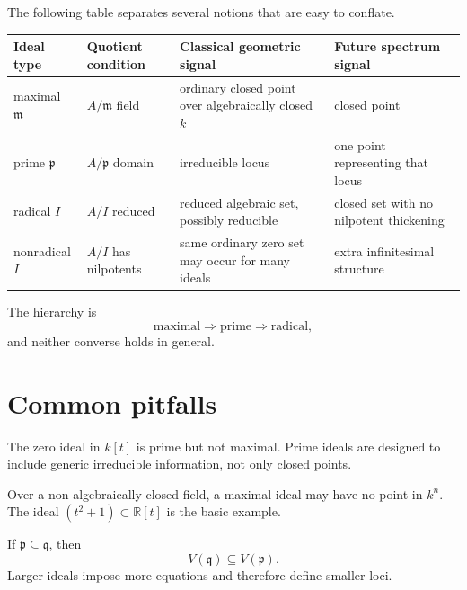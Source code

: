 The following table separates several notions that are easy to conflate.

\begin{center}
\begin{tabular}{>{\raggedright\arraybackslash}p{}>{\raggedright\arraybackslash}p{}>{\raggedright\arraybackslash}p{}>{\raggedright\arraybackslash}p{}}
\toprule
\textbf{Ideal type} & \textbf{Quotient condition} & \textbf{Classical geometric signal} & \textbf{Future spectrum signal}\\
\midrule
maximal \(\mathfrak m\) & \(A/\mathfrak m\) field & ordinary closed point over algebraically closed \(k\) & closed point\\
prime \(\mathfrak p\) & \(A/\mathfrak p\) domain & irreducible locus & one point representing that locus\\
radical \(I\) & \(A/I\) reduced & reduced algebraic set, possibly reducible & closed set with no nilpotent thickening\\
nonradical \(I\) & \(A/I\) has nilpotents & same ordinary zero set may occur for many ideals & extra infinitesimal structure\\
\bottomrule
\end{tabular}
\end{center}

The hierarchy is
\[
\text{maximal}\Longrightarrow\text{prime}\Longrightarrow\text{radical},
\]
and neither converse holds in general.

\section{Common pitfalls}

\begin{warning}
The zero ideal in \(k[t]\) is prime but not maximal.  Prime ideals are designed to include
generic irreducible information, not only closed points.
\end{warning}

\begin{warning}
Over a non-algebraically closed field, a maximal ideal may have no point in \(k^n\).  The
ideal \((t^2+1)\subset\mathbb R[t]\) is the basic example.
\end{warning}

\begin{warning}
If \(\mathfrak p\subseteq\mathfrak q\), then
\[
V(\mathfrak q)\subseteq V(\mathfrak p).
\]
Larger ideals impose more equations and therefore define smaller loci.
\end{warning}

